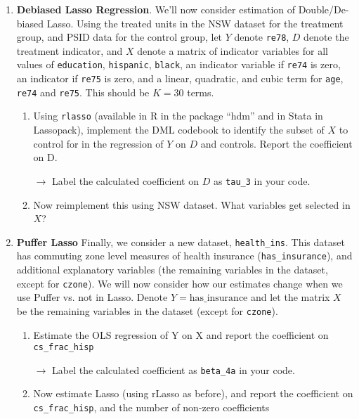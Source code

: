\documentclass[11pt, a4paper]{article}
\begin{document}
\begin{enumerate}
\begin{enumerate}
  \end{enumerate}
\item \textbf{Debiased Lasso Regression}. We'll now consider estimation of
  Double/De-biased Lasso. Using the treated units in the NSW dataset
  for the treatment group, and PSID data for the control group, let
  $Y$ denote \texttt{re78}, $D$ denote the treatment indicator, and
  $X$ denote a matrix of indicator variables for all values of
  \texttt{education}, \texttt{hispanic}, \texttt{black}, an indicator
  variable if \texttt{re74} is zero, an indicator if \texttt{re75} is
  zero, and a linear, quadratic, and cubic term for \texttt{age},
  \texttt{re74} and \texttt{re75}. This should be $K = 30$ terms. 
  \begin{enumerate}
  \item Using \texttt{rlasso} (available in R in the package ``hdm''
    and in Stata in Lassopack), implement the DML codebook to identify
    the subset of $X$ to control for in the regression of $Y$ on $D$
    and controls. Report the coefficient on D.

    \hspace{10pt} $\rightarrow$ Label the calculated coefficient on $D$ as \texttt{tau\_3} in your code.

  \item Now reimplement this using NSW dataset. What variables get
    selected in $X$?
  \end{enumerate}
\item \textbf{Puffer Lasso} Finally, we consider a new dataset,
  \texttt{health\_ins}. This dataset has commuting zone level measures
  of health insurance (\texttt{has\_insurance}), and additional
  explanatory variables (the remaining variables in the dataset,
  except for \texttt{czone}). We will now consider how our estimates
  change when we use Puffer vs. not in Lasso. Denote
  $Y = \text{has\_insurance}$ and let the matrix $X$ be the remaining
  variables in the dataset (except for \texttt{czone}).
  \begin{enumerate}
  \item Estimate the OLS regression of Y on X and report the coefficient on \texttt{cs\_frac\_hisp}

  \hspace{10pt} $\rightarrow$ Label the calculated coefficient as \texttt{beta\_4a} in your code.
  \item Now estimate Lasso (using rLasso as before), and report the coefficient on \texttt{cs\_frac\_hisp}, and the number of non-zero coefficients


\end{enumerate}
\end{enumerate}
\end{document}
